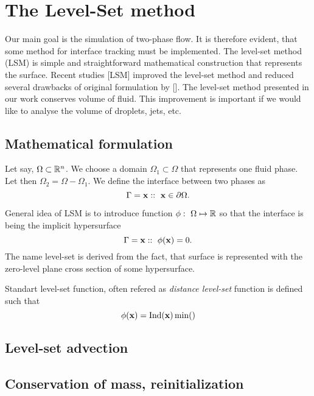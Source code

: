 \chapter{The Level-Set method}

\par Our main goal is the simulation of two-phase flow. It is therefore evident, that some method for interface tracking must be implemented.
The level-set method (LSM) is simple and straightforward mathematical construction that represents the surface. Recent studies [LSM]
improved the level-set method and reduced several drawbacks of original formulation by []. The level-set method presented in our work
conserves volume of fluid. This improvement is important if we would like to analyse the volume of droplets, jets, etc.

\section{Mathematical formulation}

\par Let say, $\Omega \subset \mathbb{R}^n$. We choose a domain $\Omega_1 \subset \Omega$ that represents one fluid phase. Let then $\Omega_2 = \Omega - \Omega_1$.
We define the interface between two phases as
$$ \Gamma = {\mathbf{x} ::~ \mathbf{x} \in \partial \Omega}. $$

\par General idea of LSM is to introduce function $\phi:~\Omega \mapsto \mathbb{R} $ so that the interface is being the implicit hypersurface
$$ \Gamma = {\mathbf{x} ::~ \phi(\mathbf{x}) = 0}. $$
The name level-set is derived from the fact, that surface is represented with the zero-level plane cross section of some hypersurface.

\par Standart level-set function, often refered as \textit{distance level-set} function is defined such that
$$ \phi(\mathbf{x}) = \mathrm{Ind}(\mathbf{x}) \min () $$ 

\section{Level-set advection}
\section{Conservation of mass, reinitialization}
